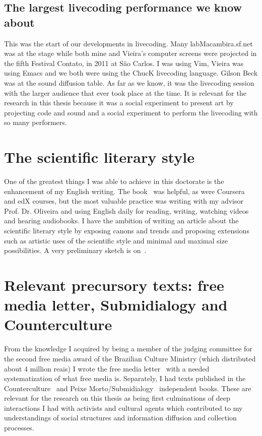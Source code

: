 \begin{apendicesenv}
\subsection{The largest livecoding performance we know about}
This was the start of our developments in livecoding.
Many labMacambira.sf.net was at the stage while both mine and Vieira's computer screens
were projected in the fifth Festival Contato, in 2011 at São Carlos.
I was using Vim, Vieira was using Emacs and we both were using the ChucK
livecoding language.
Gilson Beck was at the sound diffusion table.
As far as we know, it was the livecoding session with the larger audience
that ever took place at the time.
It is relevant for the research in this thesis because it was
a social experiment to present art by projecting code and sound
and a social experiment to perform the livecoding with so many performers.

\section{The scientific literary style}
One of the greatest things I was able to achieve in this doctorate
is the enhancement of my English writing.
The book~\cite{chuLivro} was helpful, as were Coursera and edX courses,
but the most valuable practice was writing with my advisor Prof. Dr. Oliveira
and using English daily for reading, writing, watching videos and hearing audiobooks.
I have the ambition of writing an article about the scientific literary style
by exposing canons and trends and proposing extensions such as artistic uses
of the scientific style and minimal and maximal size possibilities.
A very preliminary sketch is on~\cite{sciStyle}.

\section{Relevant precursory texts: free media letter, Submidialogy and Counterculture}
From the knowledge I acquired by being a member of the judging committee for the second
free media award of the Brazilian Culture Ministry (which distributed about 4 million reais)
I wrote the free media letter~\cite{cartaML} with a needed systematization of what free media is.
Separately, I had texts published in the Counterculture~\cite{ccd} and Peixe Morto/Submidialogy~\cite{subMid} independent books.
These are relevant for the research on this thesis as being first culminations of deep interactions
I had with activists and cultural agents which contributed to my understandings of social structures
and information diffusion and collection processes.


\end{apendicesenv}
